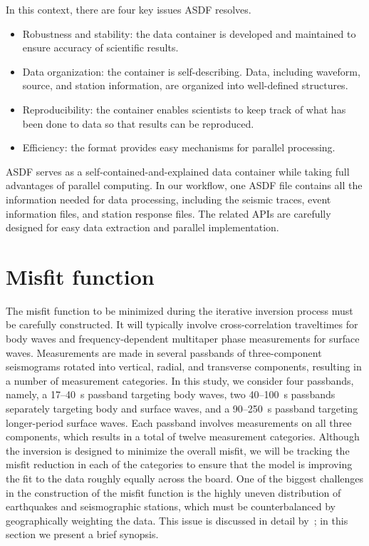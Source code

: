 \documentclass[extra,mreferee]{gji}
\begin{document}
In this context, there are four key issues ASDF resolves.
\begin{itemize}
    \item Robustness and stability: the data container is developed and maintained to ensure accuracy of scientific results.
    \item Data organization: the container is self-describing. Data, including waveform, source, and station information, are organized into well-defined structures.
    \item Reproducibility: the container enables scientists to keep track of what has been done to data so that results can be reproduced.
    \item Efficiency: the format provides easy mechanisms for parallel processing.
\end{itemize}
ASDF serves as a self-contained-and-explained data container while taking full advantages of parallel computing.
In our workflow,
one ASDF file contains all the information needed for data processing, including the seismic traces, event information files, and station response files.
The related APIs are carefully designed for easy data extraction and parallel implementation.

\section{Misfit function}
\label{section:misfit}

The misfit function to be minimized during the iterative inversion process must be carefully constructed.
It will typically involve cross-correlation traveltimes for body waves and frequency-dependent multitaper phase measurements for surface waves.
Measurements are made in several passbands of three-component seismograms rotated into vertical, radial, and transverse components, resulting in a number of measurement categories.
In this study, we consider four passbands,
namely, a 17--40~s passband targeting body waves,
two 40--100~s passbands separately targeting body and surface waves,
and a 90--250~s passband targeting longer-period surface waves.
Each passband involves measurements on all three components,
which results in a total of twelve measurement categories.
Although the inversion is designed to minimize the overall misfit,
we will be tracking the misfit reduction in each of the categories to ensure that the model is improving the fit to the data roughly equally across the board.
One of the biggest challenges in the construction of the misfit function is the highly uneven distribution of earthquakes and seismographic stations,
which must be counterbalanced by geographically weighting the data.
This issue is discussed in detail by~\cite{Ruanetal2018};
in this section we present a brief synopsis.
\end{document}
